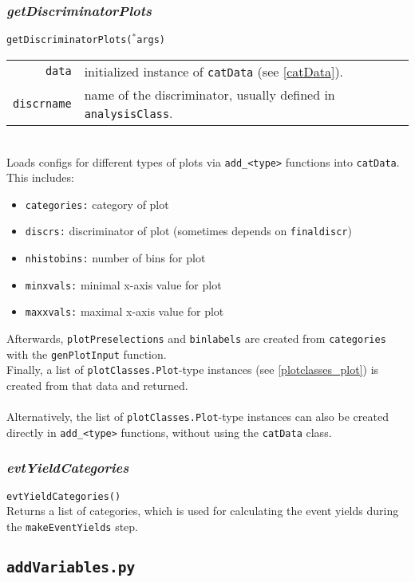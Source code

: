 \documentclass[12pt, a4paper]{article}
\newcommand{\args}{$^*$args}
\begin{document}
\subsubsection{\textit{getDiscriminatorPlots}}
\texttt{getDiscriminatorPlots(\args)}\\
\begin{tabular}{r|l}
\hline
\texttt{data}		& initialized instance of \texttt{catData} (see \ref{catData}).\\
\texttt{discrname}	& name of the discriminator, usually defined in \texttt{analysisClass}.\\
\hline
\end{tabular}
\\
Loads configs for different types of plots via \texttt{add\_<type>} functions into \texttt{catData}. This includes:
\begin{itemize} 
\itemsep-0.5em
\item \texttt{categories:}	 category of plot
\item \texttt{discrs:}	 discriminator of plot (sometimes depends on \texttt{finaldiscr})
\item \texttt{nhistobins:}	number of bins for plot
\item \texttt{minxvals:}	minimal x-axis value for plot
\item \texttt{maxxvals:}	maximal x-axis value for plot
\end{itemize}
Afterwards, \texttt{plotPreselections} and \texttt{binlabels} are created from \texttt{categories} with the \texttt{genPlotInput} function.\\
Finally, a list of \texttt{plotClasses.Plot}-type instances (see \ref{plotclasses_plot}) is created from that data and returned.\\
\\
Alternatively, the list of \texttt{plotClasses.Plot}-type instances can also be created directly in \texttt{add\_<type>} functions, without using the \texttt{catData} class.

\subsubsection{\textit{evtYieldCategories}}
\texttt{evtYieldCategories()}\\
Returns a list of categories, which is used for calculating the event yields during the \texttt{makeEventYields} step.


\subsection{\texttt{addVariables.py}}
\label{configs_addvars}
\end{document}
